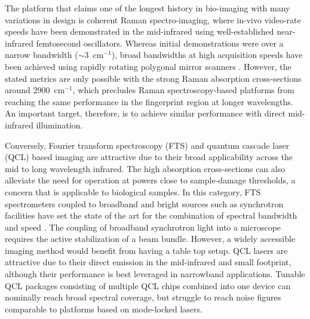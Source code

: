 \documentclass{optica-article}
\begin{document}
The platform that claims one of the longest history in bio-imaging with many variations in design is coherent Raman spectro-imaging, where in-vivo video-rate speeds have been demonstrated in the mid-infrared \cite{evansChemicalImagingTissue2005, saarVideoRateMolecularImaging2010} using well-established near-infrared femtosecond oscillators. Whereas initial demonstrations were over a narrow bandwidth (\mbox{$\sim$3 $\mathrm{cm^{-1}}$}), broad bandwidths at high acquisition speeds have been achieved using rapidly rotating polygonal mirror scanners \cite{tamamitsuUltrafastBroadbandFouriertransform2017, linMicrosecondFingerprintStimulated2021}. However, the stated metrics are only possible with the strong Raman absorption cross-sections around \mbox{2900 $\mathrm{cm^{-1}}$}, which precludes Raman spectroscopy-based platforms from reaching the same performance in the fingerprint region at longer wavelengths. An important target, therefore, is to achieve similar performance with direct mid-infrared illumination.

Conversely, Fourier transform spectroscopy (FTS) and quantum cascade laser (QCL) based imaging are attractive due to their broad applicability across the mid to long wavelength infrared. The high absorption cross-sections can also alleviate the need for operation at powers close to sample-damage thresholds, a concern that is applicable to biological samples. In this category, FTS spectrometers coupled to broadband and bright sources such as synchrotron facilities have set the state of the art for the combination of spectral bandwidth and speed \cite{nasseHighresolutionFouriertransformInfrared2011}. The coupling of broadband synchrotron light into a microscope requires the active stabilization of a beam bundle. However, a widely accessible imaging method would benefit from having a table top setup. QCL lasers are attractive due to their direct emission in the mid-infrared and small footprint, although their performance is best leveraged in narrowband applications. Tunable QCL packages consisting of multiple QCL chips combined into one device \cite{yehFastInfraredChemical2015,goyalActiveHyperspectralImaging2014,zimmerleiterQCLbasedMidinfraredHyperspectral2021} can nominally reach broad spectral coverage, but struggle to reach noise figures comparable to platforms based on mode-locked lasers.

\end{document}

